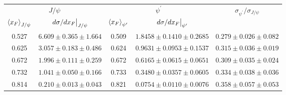 \begin{tabular}{cc|cc|c}
\hline
\multicolumn{2}{c|}{$J/\psi$} &
  \multicolumn{2}{c|}{$\psi^{\prime}$} &
  \multirow{2}{*}{$\sigma_{\psi^\prime}/\sigma_{J/\psi}$} \\ \cline{1-4}
$\expval{x_F}_{J/\psi}$ &
  $\eval{d\sigma/dx_F}_{J/\psi}$ &
  $\expval{x_F}_{\psi^\prime}$ &
  $\eval{d\sigma/dx_F}_{\psi^\prime}$ &
   \\ \hline
\multicolumn{1}{c|}{0.527} &
  $6.609\pm0.365\pm1.664$ &
  \multicolumn{1}{c|}{0.509} &
  $1.8458\pm0.1410\pm0.2685$ &
  $0.279\pm0.026\pm0.082$ \\
\multicolumn{1}{c|}{0.625} &
  $3.057\pm0.183\pm0.486$ &
  \multicolumn{1}{c|}{0.624} &
  $0.9631\pm0.0953\pm0.1537$ &
  $0.315\pm0.036\pm0.019$ \\
\multicolumn{1}{c|}{0.672} &
  $1.996\pm0.111\pm0.259$ &
  \multicolumn{1}{c|}{0.672} &
  $0.6165\pm0.0615\pm0.0651$ &
  $0.309\pm0.035\pm0.024$ \\
\multicolumn{1}{c|}{0.732} &
  $1.041\pm0.050\pm0.166$ &
  \multicolumn{1}{c|}{0.733} &
  $0.3480\pm0.0357\pm0.0605$ &
  $0.334\pm0.038\pm0.036$ \\
\multicolumn{1}{c|}{0.814} &
  $0.210\pm0.013\pm0.043$ &
  \multicolumn{1}{c|}{0.821} &
  $0.0754\pm0.0110\pm0.0076$ &
  $0.358\pm0.057\pm0.053$ \\ \hline
\end{tabular}
